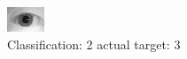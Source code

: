 \begin{figure}[h!]
\begin{center}
\includegraphics[width=0.60\columnwidth]{figures/ID1072_class_2_target_3.png}
\end{center}
\caption{ Classification: 2 actual target: 3}
\label{fig:ID1072_class_2_target_3}
\end{figure}
